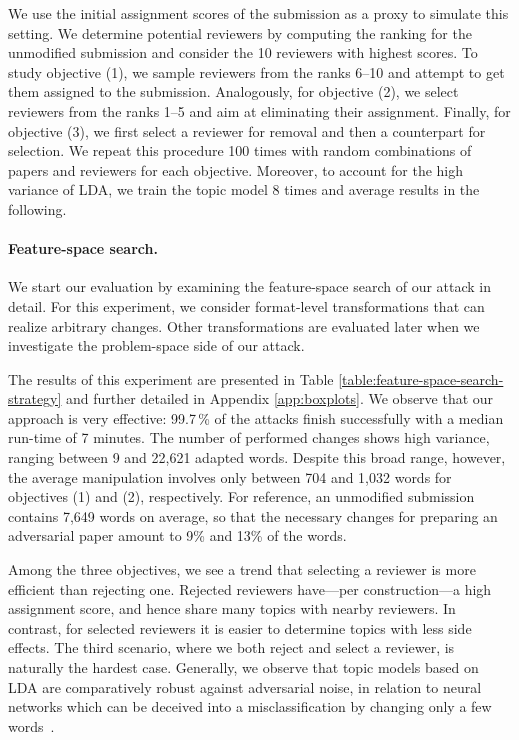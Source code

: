 \documentclass[letterpaper,twocolumn,10pt]{article}
\begin{document}
We use the initial assignment scores of the submission as a proxy to simulate this setting. We determine potential reviewers by computing the ranking for the unmodified submission and consider the 10 reviewers with highest scores. To study objective (1), we sample reviewers from the ranks 6--10 and attempt to get them assigned to the submission. Analogously, for objective (2), we select reviewers from the ranks 1--5 and aim at eliminating their assignment. Finally, for objective (3), we first select a reviewer for removal and then a counterpart for selection. We repeat this procedure 100 times with random combinations of papers and reviewers for each objective. Moreover, to account for the high variance of LDA, we train the topic model 8 times and average results in the following.


\paragraph{Feature-space search.} 

We start our evaluation by examining the feature-space search of our attack in detail. For this experiment, we consider format-level transformations that can realize arbitrary changes. Other transformations are evaluated later when we investigate the problem-space side of our attack.

The results of this experiment are presented in Table \ref{table:feature-space-search-strategy} and further detailed in Appendix \ref{app:boxplots}. We observe that our approach is very effective: 99.7\,\% of the attacks finish successfully with a median run-time of 7 minutes.
The number of performed changes shows high variance, ranging between 9 and 22,621 adapted words. Despite this broad range, however, the average manipulation involves only between 704 and 1,032 words for objectives (1) and (2), respectively. For reference, an unmodified submission contains 7,649 words on average, so that the necessary changes for preparing an adversarial paper amount to 9\% and 13\% of the words.  

Among the three objectives, we see a trend that selecting a reviewer is more efficient than rejecting one. Rejected reviewers have---per construction---a high assignment score, and hence share many topics with nearby reviewers. In contrast, for selected reviewers it is easier to determine topics with less side effects. The third scenario, where we both reject and select a reviewer, is naturally the hardest case. Generally, we observe that topic models based on \ac{LDA} are comparatively robust against adversarial noise, in relation to neural networks which can be deceived into a misclassification by changing only a few words~\cite[e.g.,][]{gao-18-blackbox, li-19-textbugger}.
\end{document}
